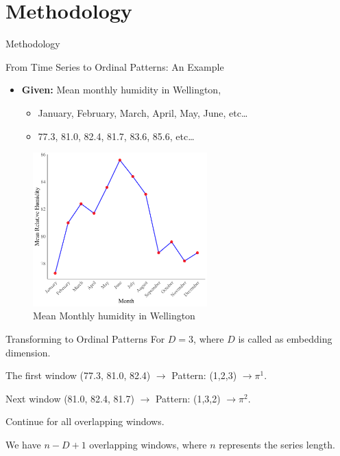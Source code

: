 \documentclass{beamer}
\begin{document}
\section{Methodology}

\begin{frame}
	\begin{center}
		\alert{Methodology}
	\end{center}
\end{frame}


\begin{frame}{From Time Series to Ordinal Patterns: An Example}
	\begin{itemize}
		\item \textbf{Given:} Mean monthly humidity in Wellington,
		\begin{itemize}
			\item January, February, March, April, May, June, etc\dots
			\item 77.3, 81.0, 82.4, 81.7, 83.6, 85.6, etc\dots 
		\end{itemize}
	\end{itemize}
\begin{figure}[hbt]
	\centering
	\includegraphics[width=0.6\textwidth]{humidity graph}
	\caption{Mean Monthly humidity in Wellington}
	\label{fig:humidity}
\end{figure}	
	
\end{frame}

\begin{frame}{Transforming to Ordinal Patterns}
	For $D=3$, where $D$ is called as \alert{embedding dimension}.
	
	The first window (77.3, 81.0, 82.4) $\rightarrow$ Pattern: (1,2,3) $\rightarrow \pi^1$.
	
	Next window (81.0, 82.4, 81.7) $\rightarrow$ Pattern: (1,3,2) $\rightarrow \pi^2$.
	
	Continue for all overlapping windows.
	
	We have $n-D+1$ overlapping windows, where $n$ represents the series length. 
\end{frame}
\end{document}
